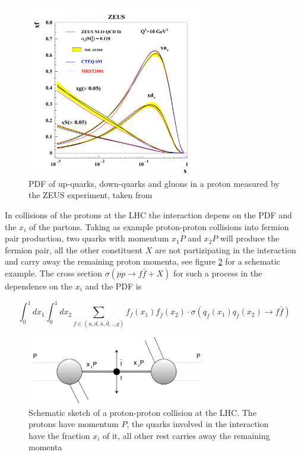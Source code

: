 \begin{figure}[ht]
	\centering
	\includegraphics[width=0.7\textwidth]{pictures/ZEUS_PDF.pdf}

	\caption[Proton \gls{PDF} from ZEUS]{\gls{PDF} of up-quarks, down-quarks and gluons in a proton measured by the ZEUS experiment, taken from \cite{PDFMEAS}}
	\label{fig:fig_2_3}
\end{figure}

In collisions of the protons at the \gls{LHC} the interaction depens on the \gls{PDF} and the $x_{i}$ of the partons. Taking as example proton-proton collisions into fermion pair production, two quarks with momentum $x_{1}P$ and $x_{2}P$ will produce the fermion pair, all the other constituent $X$ are not partizipating in the interaction and carry away the remaining proton momenta, see figure \ref{fig:fig_2_4} for a schematic example. The cross section $\sigma(pp\to f\bar{f} + X)$ \cite{Peskin} for such a process in the dependence on the $x_{i}$ and the \gls{PDF} is 

\begin{equation}
	\label{eq:eq_2_3}
	\int_{0}^{1}dx_{1}\int_{0}^{1}dx_{2}\sum_{f \in (u, d, \bar{u}, \bar{d}, ... g)} f_{f}(x_{1})f_{\bar{f}}(x_{2}) \cdot \sigma(q_{f}(x_{1})q_{\bar{f}}(x_{2}) \to f\bar{f}) 
\end{equation}


\begin{figure}[ht]
	\centering
	\includegraphics[width=0.7\textwidth]{pictures/ppcollision.pdf}

	\caption[Schematic sketch of proton-proton collision]{Schematic sketch of a proton-proton collision at the \gls{LHC}. The protons have momentum $P$, the quarks involved in the interaction have the fraction $x_{i}$ of it, all other rest carries away the remaining momenta}
	\label{fig:fig_2_4}
\end{figure}


